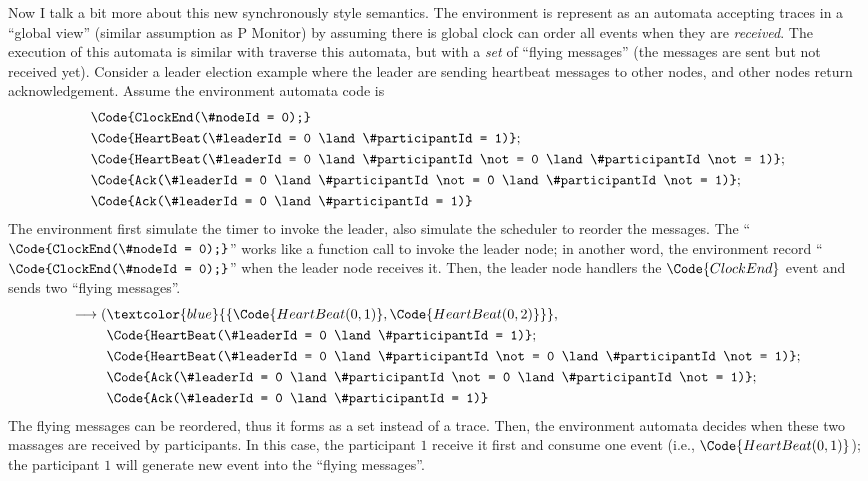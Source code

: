 Now I talk a bit more about this new synchronously style semantics. The environment is represent as an automata accepting traces in a ``global view'' (similar assumption as P Monitor) by assuming there is global clock can order all events when they are \emph{received}.
The execution of this automata is similar with traverse this automata, but with a \emph{set} of ``flying messages'' (the messages are sent but not received yet). Consider a leader election example where the leader are sending heartbeat messages to other nodes, and other nodes return acknowledgement. Assume the environment automata code is
\begin{align*}
    &\Code{ClockEnd(\#nodeId = 0);} 
    \\&\Code{HeartBeat(\#leaderId = 0 \land \#participantId = 1)};
    \\&\Code{HeartBeat(\#leaderId = 0 \land \#participantId \not= 0 \land \#participantId \not= 1)};
    \\&\Code{Ack(\#leaderId = 0 \land \#participantId \not= 0 \land \#participantId \not= 1)};
    \\&\Code{Ack(\#leaderId = 0 \land \#participantId = 1)}
\end{align*}
The environment first simulate the timer to invoke the leader, also simulate the scheduler to reorder the messages. The ``$\Code{ClockEnd(\#nodeId = 0);}$'' works like a function call to invoke the leader node; in another word, the environment record ``$\Code{ClockEnd(\#nodeId = 0);}$'' when the leader node receives it. Then, the leader node handlers the $\Code{ClockEnd}$ event and sends two ``flying messages''.
\begin{align*}
    \longrightarrow (&\textcolor{blue}{\{\Code{HeartBeat(0, 1)}, \Code{HeartBeat(0, 2)}\}}, 
    \\&\Code{HeartBeat(\#leaderId = 0 \land \#participantId = 1)};
    \\&\Code{HeartBeat(\#leaderId = 0 \land \#participantId \not= 0 \land \#participantId \not= 1)};
    \\&\Code{Ack(\#leaderId = 0 \land \#participantId \not= 0 \land \#participantId \not= 1)};
    \\&\Code{Ack(\#leaderId = 0 \land \#participantId = 1)}
\end{align*}
The flying messages can be reordered, thus it forms as a set instead of a trace. Then, the environment automata decides when these two massages are received by participants. In this case, the participant $1$ receive it first and consume one event (i.e., $\Code{HeartBeat(0, 1)}$); the participant $1$ will generate new event into the ``flying messages''.

